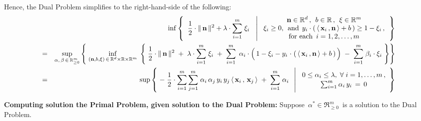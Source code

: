 Hence, the Dual Problem simplifies to the right-hand-side of the following:
\begin{eqnarray*}
&&
	\inf
	\left\{\;\;
		\dfrac{1}{2}\cdot\Vert\,\mathbf{n}\,\Vert^{2}
		+
		\lambda\cdot\overset{m}{\underset{i=1}{\sum}}\;\xi_{i}
		\;\;\,\left\vert\;
		\begin{array}{c}
			\mathbf{n} \in \Re^{d} \,,\;\, b \in \Re \,,\;\, \xi \in \Re^{m}
			\\
			\xi_{i} \geq 0,\;\,\textnormal{and}\;\,
			y_{i}\cdot\left(\,\langle\,\mathbf{x}_{i}\,,\mathbf{n}\,\rangle + b\,\right) \geq 1 - \xi_{i}\,,
			\\
			\textnormal{for each \,$i = 1,2,\ldots,m$}
			\end{array}
			\right.
		\right\}
\\
& = &
	\underset{\alpha,\,\beta\,\in\,\Re_{\geq 0}^{m}}{\sup}
	\left\{\;
		\underset{(\mathbf{n},b,\xi)\,\in\,\Re^{d}\times\Re\times\Re^{m}}{\inf}\;
		\left\{\;
			\dfrac{1}{2}\cdot\Vert\,\mathbf{n}\,\Vert^{2}
			\; + \;
			\lambda\cdot\overset{m}{\underset{i=1}{\sum}}\;\xi_{i}
			\; + \;
			\overset{m}{\underset{i = 1}{\sum}}\;\,
				\alpha_{i}
				\cdot
				\left(\,
					1 - \xi_{i}
					-
					y_{i}\overset{{\color{white}1}}{\cdot}\left(\,
						\langle\,\mathbf{x}_{i}\,,\mathbf{n}\,\rangle + b
						\,\right)
					\,\right)
			\; - \;
			\overset{m}{\underset{i = 1}{\sum}}\;
				\beta_{i}
				\cdot
				\xi_{i}
			\;\right\}
		\right\}
\\
& = &
	\sup
	\left\{\,
	\left.
		-\;\dfrac{1}{2}\cdot
		\overset{m}{\underset{i=1}{\sum}}\,
		\overset{m}{\underset{j=1}{\sum}}\;
		\alpha_{i}\,\alpha_{j}\,y_{i}\,y_{j}\,\langle\,\mathbf{x}_{i}\,,\,\mathbf{x}_{j}\,\rangle
		\; + \;
		\overset{m}{\underset{i = 1}{\sum}}\;\alpha_{i}
	\;\;\,\right\vert\,
		\begin{array}{c}
			0 \leq \alpha_{i} \leq \lambda,\;\forall\;i =1,\ldots,m\,,
			\\
			\sum_{i=1}^{m}\alpha_{i}\,y_{i} \,=\, \overset{{\color{white}.}}{0}
		\end{array}
		\right\}
\end{eqnarray*}

\vskip 0.5cm
\noindent
\textbf{Computing solution the Primal Problem, given solution to the Dual Problem:}
\vskip 0.1cm
\noindent
Suppose \,$\alpha^{*} \in \Re_{\geq 0}^{m}$\, is a solution to the Dual Problem.

